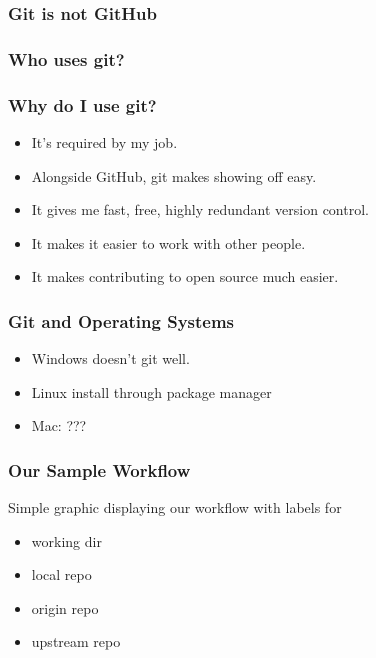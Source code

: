 \documentclass[unknownkeysallowed]{beamer}
\begin{document}
\begin{frame}
    \frametitle{Git is not GitHub}
    \vspace{1cm} %
\end{frame}

\begin{frame}
    \frametitle{Who uses git?}

    \vspace{1cm} %
\end{frame}

\begin{frame}
    \frametitle{Why do I use git?}
    \begin{itemize}
        \item{It's required by my job.}
        \item{Alongside GitHub, git makes showing off easy.}
        \item{It gives me fast, free, highly redundant version control.}
        \item{It makes it easier to work with other people.}
        \item{It makes contributing to open source much easier.}
    \end{itemize}
    \vspace{1cm} %
\end{frame}

\begin{frame}
    \frametitle{Git and Operating Systems}
    \begin{itemize}
        \item{Windows doesn't git well.}
        \item{Linux install through package manager}
        \item{Mac: ???}
    \end{itemize}
    \vspace{1cm} %
\end{frame}

\begin{frame}
    \frametitle{Our Sample Workflow}
      Simple graphic displaying our workflow with labels for
      \begin{itemize}
        \item{working dir}
        \item{local repo}
        \item{origin repo}
        \item{upstream repo}
      \end{itemize}
    \vspace{1cm} %
\end{frame}
\end{document}
